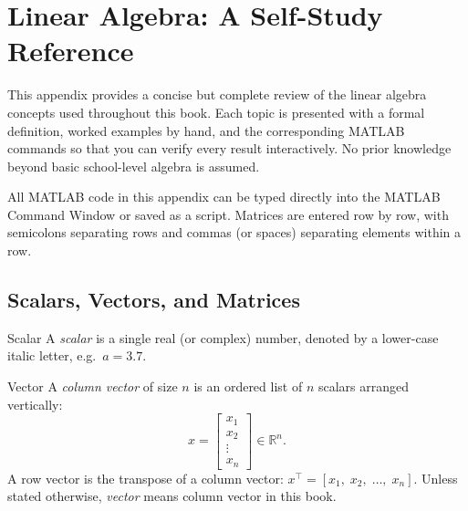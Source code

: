 
\chapter{Linear Algebra: A Self-Study Reference}
\label{app:linalg}

This appendix provides a concise but complete review of the linear
algebra concepts used throughout this book.  Each topic is
presented with a formal definition, worked examples by hand, and the
corresponding MATLAB commands so that you can verify every result
interactively.  No prior knowledge beyond basic school-level algebra is
assumed.

All MATLAB code in this appendix can be typed directly into the MATLAB
Command Window or saved as a script.  Matrices are entered row by row,
with semicolons separating rows and commas (or spaces) separating
elements within a row.

\section{Scalars, Vectors, and Matrices}
\label{sec:app_basics}

\begin{defnbox}{Scalar}
	A \emph{scalar} is a single real (or complex) number, denoted by a
	lower-case italic letter, e.g.\ $a = 3.7$.
\end{defnbox}

\begin{defnbox}{Vector}
	A \emph{column vector} of size $n$ is an ordered list of $n$ scalars
	arranged vertically:
	\[
	{x} =
	\begin{bmatrix} x_1 \\ x_2 \\ \vdots \\ x_n \end{bmatrix}
	\in \mathbb{R}^n.
	\]
	A {row vector} is the transpose of a column vector:
	${x}^\top = [x_1,\; x_2,\; \ldots,\; x_n]$.  Unless stated
	otherwise, \emph{vector} means column vector in this book.
\end{defnbox}

